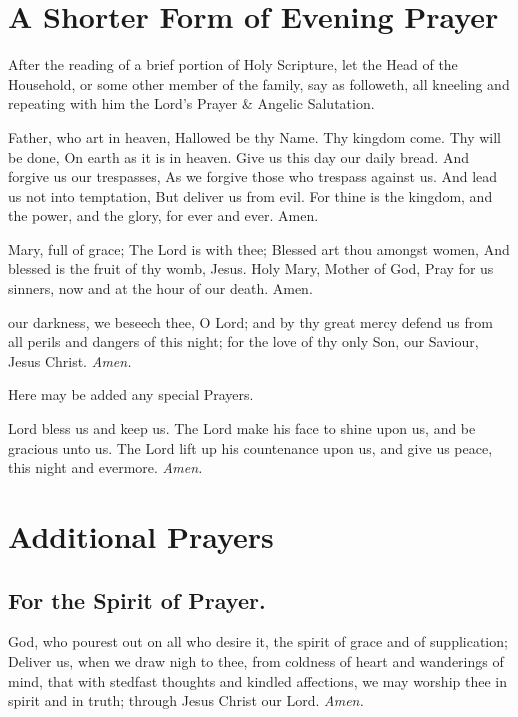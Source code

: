 \clearpage
\section{A Shorter Form of Evening Prayer}
\begin{secrubric}
    After the reading of a brief portion of Holy Scripture, let the Head of the Household, or some other member of the family, say as followeth, all kneeling and repeating with him the Lord's Prayer \& Angelic Salutation.
\end{secrubric}

 Father, who art in heaven, Hallowed be thy Name. Thy kingdom come. Thy will be done, On earth as it is in heaven. Give us this day our daily bread. And forgive us our trespasses, As we forgive those who trespass against us. And lead us not into temptation, But deliver us from evil. For thine is the kingdom, and the power, and the glory, for ever and ever. Amen.

 Mary, full of grace; The Lord is with thee; Blessed art thou amongst women, And blessed is the fruit of thy womb, Jesus. Holy Mary, Mother of God, Pray for us sinners, now and at the hour of our death. Amen.

 our darkness, we beseech thee, O Lord; and by thy great mercy defend us from all perils and dangers of this night; for the love of thy only Son, our Saviour, Jesus Christ. \textit{Amen.}

\begin{rubric}
    Here may be added any special Prayers.
\end{rubric}

 Lord bless us and keep us. The Lord make his face to shine upon us, and be gracious unto us. The Lord {} lift up his countenance upon us, and give us peace, this night and evermore. \textit{Amen.}

\clearpage
\section{Additional Prayers}
\subsection{For the Spirit of Prayer.}
 God, who pourest out on all who desire it, the spirit of grace and of supplication; Deliver us, when we draw nigh to thee, from coldness of heart and wanderings of mind, that with stedfast thoughts and kindled affections, we may worship thee in spirit and in truth; through Jesus Christ our Lord. \textit{Amen.}

